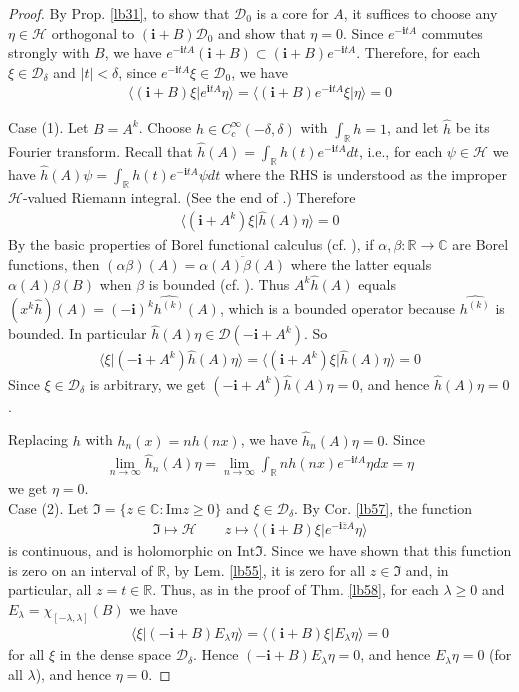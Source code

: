 \documentclass[12pt,b5paper,notitlepage]{article}
\theoremstyle{definition}
\theoremstyle{plain}
\newcommand{\fk}{\mathfrak}
\newcommand{\mc}{\mathcal}
\newcommand{\wht}{\widehat}
\newcommand{\ovl}{\overline}
\newcommand{\Dom}{\scr{D}}
\newcommand{\bk}[1]{\langle {#1}\rangle}
\newcommand{\scr}{\mathscr}
\newcommand{\im}{\mathbf{i}}
\newcommand{\Cbb}{\mathbb C}
\newcommand{\Rbb}{\mathbb R}
\newcommand{\Imag}{\mathrm{Im}}
\newcommand{\Int}{\mathrm{Int}}
\numberwithin{equation}{section}
\begin{document}
\begin{proof}
By Prop. \ref{lb31}, to show that $\Dom_0$ is a core for $A$, it suffices to choose any $\eta\in\mc H$ orthogonal to $(\im+B)\Dom_0$ and show that $\eta=0$. Since $e^{-\im tA}$ commutes strongly with $B$, we have $e^{-\im tA}(\im+B)\subset(\im+B)e^{-\im tA}$. Therefore, for each $\xi\in\Dom_\delta$ and $|t|<\delta$, since $e^{-\im tA}\xi\in\Dom_0$, we have
\begin{align*}
\bk{(\im+B)\xi|e^{\im tA}\eta}=\bk{(\im+B)e^{-\im tA}\xi|\eta}=0
\end{align*}

Case (1). Let $B=A^k$. Choose $h\in C_c^\infty(-\delta,\delta)$ with $\int_\Rbb h=1$, and let $\wht h$ be its Fourier transform. Recall that $\wht h(A)=\int_\Rbb h(t)e^{-\im tA}dt$, i.e., for each $\psi\in\mc H$ we have $\wht h(A)\psi=\int_\Rbb h(t)e^{-\im tA}\psi dt$ where the RHS is understood as the improper $\mc H$-valued Riemann integral. (See the end of \cite[Sec. 10]{Gui-S}.) Therefore
\begin{align*}
\bk{(\im+A^k)\xi|\wht h(A)\eta}=0
\end{align*}
By the basic properties of Borel functional calculus (cf. \cite[Sec. 9]{Gui-S}), if $\alpha,\beta:\Rbb\rightarrow\Cbb$ are Borel functions, then $(\alpha\beta)(A)=\ovl{\alpha(A)\beta(A)}$ where the latter equals $\alpha(A)\beta(B)$ when $\beta$ is bounded (cf. \cite[Prop. 8.1]{Gui-S}). Thus $A^k\wht h(A)$ equals $(x^k\wht h)(A)=(-\im)^k\wht{h^{(k)}}(A)$, which is a bounded operator because $\wht{h^{(k)}}$ is bounded. In particular $\wht h(A)\eta\in\Dom(-\im+A^k)$. So
\begin{align*}
\bk{\xi|(-\im+A^k)\wht h(A)\eta}=\bk{(\im+A^k)\xi|\wht h(A)\eta}=0
\end{align*}
Since $\xi\in\Dom_\delta$ is arbitrary, we get $(-\im+A^k)\wht h(A)\eta=0$, and hence $\wht h(A)\eta=0$. 

Replacing $h$ with $h_n(x)=nh(nx)$, we have $\wht h_n(A)\eta=0$. Since 
\begin{align*}
\lim_{n\rightarrow\infty}\wht h_n(A)\eta=\lim_{n\rightarrow\infty} \int_\Rbb nh(nx)e^{-\im tA}\eta dx=\eta
\end{align*}
we get $\eta=0$.\\[-1ex]

Case (2). Let $\fk I=\{z\in\Cbb:\Imag z\geq0\}$ and $\xi\in\Dom_\delta$. By Cor. \ref{lb57}, the function 
\begin{align*}
\fk I\mapsto\mc H\qquad z\mapsto \bk{(\im+B)\xi|e^{-\im \ovl zA}\eta}
\end{align*}
is continuous, and is holomorphic on $\Int\fk I$. Since we have shown that this function is zero on an interval of $\Rbb$, by Lem. \ref{lb55}, it is zero for all $z\in\fk I$ and, in particular, all $z=t\in\Rbb$. Thus, as in the proof of Thm. \ref{lb58}, for each $\lambda\geq0$ and $E_\lambda=\chi_{[-\lambda,\lambda]}(B)$ we have
\begin{align*}
\bk{\xi|(-\im+B)E_\lambda\eta}=\bk{(\im+B)\xi|E_\lambda\eta}=0
\end{align*}
for all $\xi$ in the dense space $\Dom_\delta$. Hence $(-\im+B)E_\lambda\eta=0$, and hence $E_\lambda\eta=0$ (for all $\lambda$), and hence $\eta=0$.
\end{proof}
\end{document}
